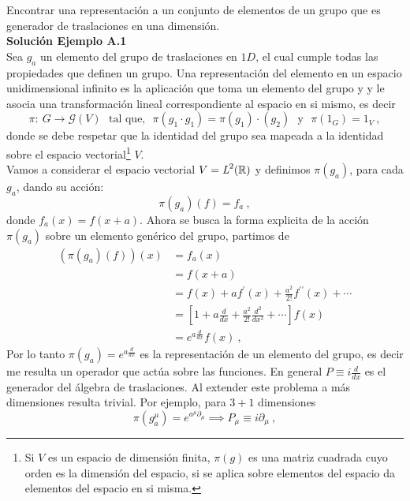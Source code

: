 \begin{example}
Encontrar una representación a un conjunto de elementos de un grupo que es generador de traslaciones en una dimensión.\\

\textbf{Solución Ejemplo A.1}\\

Sea $g_{a}$ un elemento del grupo de traslaciones en $1D$, el cual cumple todas las propiedades que definen un grupo. Una representación del elemento en un espacio unidimensional infinito es la aplicación que toma un elemento del grupo y y le asocia una transformación lineal correspondiente al espacio en si mismo, es decir 
\begin{equation*}
    \pi:~G \rightarrow \mathcal{G}(V)~~~\text{tal que,}~~~\pi(g_{1}\cdot g_{1})=\pi(g_{1})\cdot (g_{2})~~~\text{y}~~~\pi(1_{G})=1_{V}~,
\end{equation*}
donde se debe respetar que la identidad del grupo sea mapeada a la identidad sobre el espacio vectorial\footnote{Si $V$ es un espacio de dimensión finita, $\pi(g)$ es una matriz cuadrada cuyo orden es la dimensión del espacio, si se aplica sobre elementos del espacio da elementos del espacio en si misma.} $V$.\\

Vamos a considerar el espacio vectorial $V=\emph{L}^2(\mathbb{R})$ y definimos $\pi(g_{a})$, para cada $g_{a}$, dando su acción:
\begin{equation}
    \pi(g_{a})(f)=f_{a}~,
\end{equation}
donde $f_{a}(x)=f(x+a).$ Ahora se busca la forma explicita de la acción $\pi(g_{a})$ sobre un elemento genérico del grupo, partimos de 
\begin{equation}
    \begin{split}
        \left(\pi(g_{a})(f)\right)(x) & = f_{a}(x)\\
                                      & = f(x+a)\\
                                      & = f(x) + af^{\prime}(x) + \frac{a^{2}}{2!}f^{\prime \prime}(x)+\cdots\\
                                      & = \left[1 + a\frac{d}{dx}+\frac{a^{2}}{2!}\frac{d^{2}}{dx^{2}} +\cdots \right]f(x)\\
                                      & = e^{a\frac{d}{dx}}f(x)~,
    \end{split}
\end{equation}
Por lo tanto $\pi(g_{a})=e^{a\frac{d}{dx}}$ es la representación de un elemento del grupo, es decir me resulta un operador que actúa sobre las funciones. En general $P \equiv i\frac{d}{dx}$ es el generador del álgebra de traslaciones. Al extender este problema a más dimensiones resulta trivial. Por ejemplo, para $3+1$ dimensiones
\begin{equation}
    \pi(g_{a}^{\mu})=e^{a^{\mu}\partial_{\mu}} \implies P_{\mu}\equiv i\partial_{\mu}~,
\end{equation}
\end{example}

